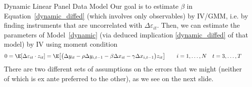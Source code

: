 \documentclass[aspectratio=169, handout]{beamer}
\begin{document}
{\footnotesize
\begin{frame}{Dynamic Linear Panel Data Model}
Our goal is to estimate $\beta$ in Equation~\ref{dynamic_diffed} (which
involves only observables) by IV/GMM, i.e. by finding instruments that
are uncorrelated with $\Delta \varepsilon_{it}$.
Then, we can estimate the parameters of Model~\ref{dynamic} (via deduced
implication \ref{dynamic_diffed} of that model) by IV using moment
condition
\begin{align*}
  0 &= \E[\Delta \varepsilon_{it}\cdot z_{it}]
  =
  \E\big[
    \big(
      \Delta y_{it}
      - \rho \Delta y_{i,t-1}
      - \beta \Delta x_{it}
      - \gamma \Delta x_{i,t-1}
    \big)
    z_{it}
  \big]
  \qquad
  i = 1,\ldots,N
  \quad
  t = 3,\ldots,T
\end{align*}
There are two different sets of assumptions on the errors that we might
(neither of which is ex ante preferred to the other), as we see on the
next slide.
\end{frame}
}
\end{document}
